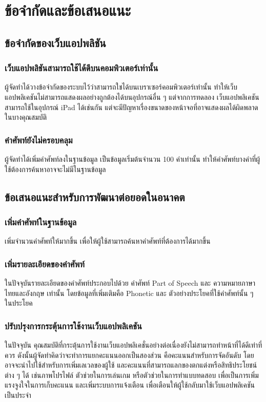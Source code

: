 \documentclass[12pt,oneside,openright,a4paper]{cpe-thai-project}
\begin{document}
\section{ข้อจำกัดและข้อเสนอแนะ}
\subsection{ข้อจำกัดของเว็บแอปพลิชัน}
\subsubsection{เว็บแอปพลิชันสามารถใช้ได้ดีบนคอมพิวเตอร์เท่านั้น}
\hspace{1cm}
ผู้จัดทำได้วางข้อจำกัดของระบบไว้ว่าสามารถใชได้บนเบราเซอร์คอมพิวเตอร์เท่านั้น ทำให้เว็บแอปพลิเคชันไม่สามารถแสดงผลอย่างถูกต้องได้บนอุปกรณ์อื่น ๆ
แต่จากการทดลอง เว็บแอปพลิเคชันสามารถใช้ในอุปกรณ์ iPad ได้เช่นกัน แต่จะมีปัญหาเรื่องขนาดของหน้าจอที่อาจแสดงผลได้ผิดพลาดในบางคุณสมบัติ

\subsubsection{คำศัพท์ยังไม่ครอบคลุม}
\hspace{1cm}
ผู้จัดทำได้เพิ่มคำศัพท์ลงในฐานข้อมูล เป็นข้อมูลเริ่มต้นจำนวน 100 คำเท่านั้น ทำให้คำศัพท์บางคำที่ผู้ใช้ต้องการค้นหาอาจจะไม่มีในฐานข้อมูล

\subsection{ข้อเสนอแนะสำหรับการพัฒนาต่อยอดในอนาคต}
\subsubsection{เพิ่มคำศัพท์ในฐานข้อมูล}
\hspace{1cm}
เพิ่มจำนวนคำศัพท์ให้มากขึ้น เพื่อให้ผู้ใช้สามารถค้นหาคำศัพท์ที่ต้องการได้มากขึ้น

\subsubsection{เพิ่มรายละเอียดของคำศัพท์}
\hspace{1cm}
ในปัจจุบันรายละเอียดของคำศัพท์ประกอบไปด้วย คำศัพท์ Part of Speech และ ความหมายภาษาไทยและอังกฤษ เท่านั้น
โดยข้อมูลที่เพิ่มเติมคือ Phonetic และ ตัวอย่างประโยคที่ใช้คำศัพท์นั้น ๆ ในประโยค

\subsubsection{ปรับปรุงการกระตุ้นการใช้งานเว็บแอปพลิเคชัน}
\hspace{1cm}
ในปัจจุบัน คุณสมบัติที่กระตุ้นการใช้งานเว็บแอปพลิเคชั่นอย่างต่อเนื่องยังไม่สามารถทำหน้าที่ได้ดีเท่าที่ควร
ดังนั้นผู้จัดทำคิดว่าจะทำการแยกคะแนนออกเป็นสองส่วน คือคะแนนสำหรับการจัดอันดับ
โดยอาจจะนำไปใช้สำหรับการเพิ่มเลเวลของผู้ใช้ และคะแนนที่สามารถแลกของตกแต่งหรือสิทธิประโยชน์ต่าง ๆ ได้ เช่นภาพโปรไฟล์
ตัวช่วยในการเล่นเกม หรือตัวช่วยในการทำแบบทดสอบ เพื่อเป็นการเพิ่มแรงจูงใจในการเก็บคะแนน และเพิ่มระบบการแจ้งเตือน
เพื่อเตือนให้ผู้ใช้กลับมาใช้เว็บแอปพลิเคชันเป็นประจำ
\end{document}
